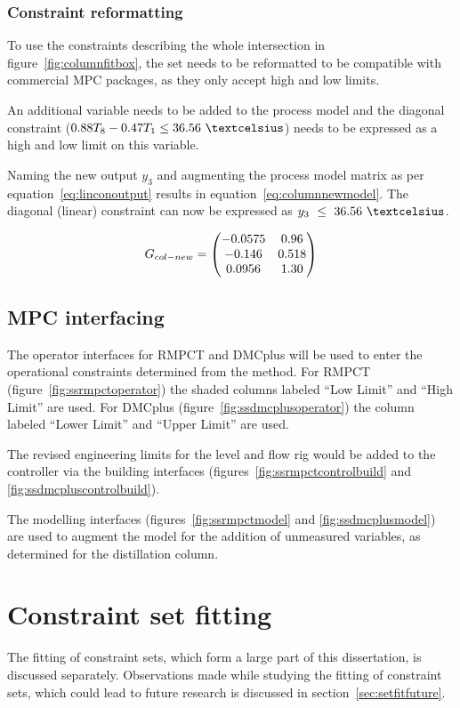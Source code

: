 \subsubsection{Constraint reformatting}
To use the constraints describing the whole intersection in figure~\ref{fig:columnfitbox}, the set needs to be reformatted to be compatible with commercial MPC packages, as they only accept high and low limits.

An additional variable needs to be added to the process model and the diagonal constraint ($0.88T_8-0.47T_1\leq 36.56~\textcelsius$) needs to be expressed as a high and low limit on this variable.

Naming the new output $y_3$ and augmenting the process model matrix as per equation~\ref{eq:linconoutput} results in equation~\ref{eq:columnnewmodel}.
The diagonal (linear) constraint can now be expressed as {$y_3~\leq~36.56~\textcelsius$}.

\begin{equation}
  \label{eq:columnnewmodel}
  G_{col-new}= \bpm -0.0575 & 0.96 \\       %
                  -0.146  & 0.518 \\      %
                   0.0956 & 1.30 \\ \epm  %
\end{equation}

\subsection{MPC interfacing}
The operator interfaces for RMPCT and DMCplus will be used to enter the operational constraints determined from the method.
For RMPCT (figure~\ref{fig:ssrmpctoperator}) the shaded columns labeled ``Low Limit'' and ``High Limit'' are used.
For DMCplus (figure~\ref{fig:ssdmcplusoperator}) the column labeled ``Lower Limit'' and ``Upper Limit'' are used.

The revised engineering limits for the level and flow rig would be added to the controller via the building interfaces (figures~\ref{fig:ssrmpctcontrolbuild} and \ref{fig:ssdmcpluscontrolbuild}).

The modelling interfaces (figures~\ref{fig:ssrmpctmodel} and \ref{fig:ssdmcplusmodel}) are used to augment the model for the addition of unmeasured variables, as determined for the distillation column.

\section{Constraint set fitting}
The fitting of constraint sets, which form a large part of this dissertation, is discussed separately.
Observations made while studying the fitting of constraint sets, which could lead to future research is discussed in section~\ref{sec:setfitfuture}.


